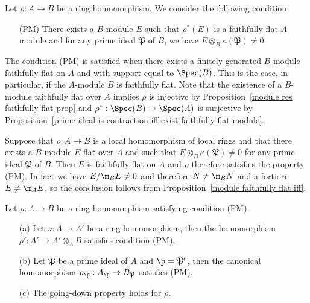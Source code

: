 Let $\rho:A\to B$ be a ring homomorphism. We consider the following condition
\begin{enumerate}[leftmargin=35pt]
\item[(PM)] There exists a $B$-module $E$ such that $\rho^*(E)$ is a faithfully flat $A$-module and for any prime ideal $\mathfrak{P}$ of $B$, we have $E\otimes_B\kappa(\mathfrak{P})\neq 0$.
\end{enumerate}
The condition (PM) is satisfied when there exists a finitely generated $B$-module faithfully flat on $A$ and with support equal to $\Spec(B)$. This is the case, in particular, if the $A$-module $B$ is faithfully flat. Note that the existence of a $B$-module faithfully flat over $A$ implies $\rho$ is injective by Proposition~\ref{module res faithfully flat prop} and $\rho^*:\Spec(B)\to\Spec(A)$ is surjective by Proposition~\ref{prime ideal is contraction iff exist faithfully flat module}.
\begin{example}\label{local ring local homomorphism condition PM}
Suppose that $\rho:A\to B$ is a local homomorphism of local rings and that there exists a $B$-module $E$ flat over $A$ and such that $E\otimes_B\kappa(\mathfrak{P})\neq 0$ for any prime ideal $\mathfrak{P}$ of $B$. Then $E$ is faithfully flat on $A$ and $\rho$ therefore satisfies the property (PM). In fact we have $E/\m_BE\neq 0$ and therefore $N\neq\m_BN$ and a fortiori $E\neq\m_AE$, so the conclusion follows from Proposition~\ref{module faithfully flat iff}.
\end{example}
\begin{proposition}\label{ring homomorphism condition PM prop}
Let $\rho:A\to B$ be a ring homomorphism satisfying condition (PM).
\begin{itemize}
\item[(a)] Let $\nu:A\to A'$ be a ring homomorphism, then the homomorphism $\rho':A'\to A'\otimes_AB$ satisfies condition (PM).
\item[(b)] Let $\mathfrak{P}$ be a prime ideal of $A$ and $\p=\mathfrak{P}^c$, then the canonical homomorphism $\rho_\p:A_\p\to B_{\mathfrak{P}}$ satisfies (PM).
\item[(c)] The going-down property holds for $\rho$.
\end{itemize}
\end{proposition}
